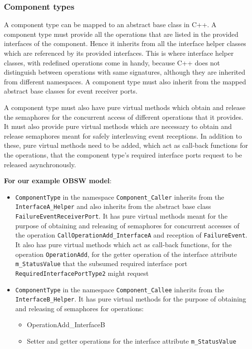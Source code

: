 \subsubsection{\textbf{Component types}}
A component type can be mapped to an abstract base class in C++. A component type must provide all the operations that are listed in the provided interfaces of the component. Hence it inherits from all the interface helper classes which are referenced by its provided interfaces. This is where interface helper classes, with redefined operations come in handy, because C++ does not distinguish between operations with same signatures, although they are inherited from different namespaces. A component type must also inherit from the mapped abstract base classes for event receiver ports.

A component type must also have pure virtual methods which obtain and release the semaphores for the concurrent access of different operations that it provides. It must also provide pure virtual methods which are necessary to obtain and release semaphores meant for safely interleaving event receptions. In addition to these, pure virtual methods need to be added, which act as call-back functions for the operations, that the component type's required interface ports request to be released asynchronously.   

\textbf{For our example OBSW model}:
\begin{itemize}
\item \texttt{ComponentType} in the namespace \texttt{Component\_Caller} inherits from the \texttt{InterfaceA\allowbreak\_Helper} and also inherits from the abstract base class \texttt{FailureEvent\allowbreak ReceiverPort}. It has pure virtual methods meant for the purpose of obtaining and releasing of semaphores for concurrent accesses of the operation \texttt{CallOperationAdd\allowbreak\_InterfaceA} and reception of \texttt{FailureEvent}. It also has pure virtual methods which act as call-back functions, for the operation \texttt{OperationAdd}, for the getter operation of the interface attribute \texttt{m\_StatusValue} that the subsumed required interface port \texttt{RequiredInterfacePortType2} might request
\item \texttt{ComponentType} in the namespace \texttt{Component\_Callee} inherits from the \texttt{InterfaceB\allowbreak\_Helper}. It has pure virtual methods for the purpose of obtaining and releasing of semaphores for operations:
\begin{itemize}
\item {OperationAdd\allowbreak\_InterfaceB}
\item Setter and getter operations for the interface attribute \texttt{m\_StatusValue}
\end{itemize}   
\end{itemize}

